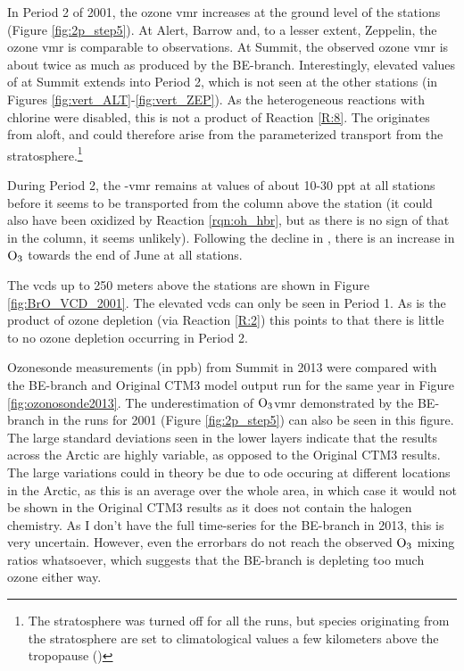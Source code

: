 \medskip

In Period 2 of 2001, the ozone \acrshort{vmr} increases at the ground level of the stations (Figure \ref{fig:2p_step5}). At Alert, Barrow and, to a lesser extent, Zeppelin, the ozone \acrshort{vmr} is comparable to observations. At Summit, the observed ozone \acrshort{vmr} is about twice as much as produced by the BE-branch. Interestingly, elevated values of  at Summit extends into Period 2, which is not seen at the other stations (in Figures \ref{fig:vert_ALT}-\ref{fig:vert_ZEP}). As the heterogeneous reactions with chlorine were disabled, this is not a product of Reaction \ref{R:8}. The  originates from aloft, and could therefore arise from the parameterized transport from the stratosphere.\footnote{The stratosphere was turned off for all the runs, but species originating from the stratosphere are set to climatological values a few kilometers above the tropopause (\cite{Sovde2012})} 

\medskip

During Period 2, the -\acrshort{vmr} remains at values of about 10-30 ppt at all stations before it seems to be transported from the column above the station (it could also have been oxidized by Reaction \ref{rqn:oh_hbr}, but as there is no sign of that in the  column, it seems unlikely). Following the decline in , there is an increase in $\mathrm{O_3}$ towards the end of June at all stations. 

\medskip

The  \acrshort{vcd}s up to 250 meters above the stations are shown in Figure \ref{fig:BrO_VCD_2001}. The elevated \acrshort{vcd}s can only be seen in Period 1. As  is the product of ozone depletion (via Reaction \ref{R:2}) this points to that there is little to no ozone depletion occurring in Period 2. 

\medskip

Ozonesonde measurements (in ppb) from Summit in 2013  were compared with the BE-branch and Original CTM3 model output run for the same year in Figure \ref{fig:ozonosonde2013}. The underestimation of $\mathrm{O_3}$\acrshort{vmr} demonstrated by the BE-branch in the runs for 2001 (Figure \ref{fig:2p_step5}) can also be seen in this figure. The large standard deviations seen in the lower layers indicate that the results across the Arctic are highly variable, as opposed to the Original CTM3 results. The large variations could in theory be due to \acrshort{ode} occuring at different locations in the Arctic, as this is an average over the whole area, in which case it would not be shown in the Original CTM3 results as it does not contain the halogen chemistry. As I don't have the full time-series for the BE-branch in 2013, this is very uncertain. However, even the errorbars do not reach the observed $\mathrm{O_3}$ mixing ratios whatsoever, which suggests that the BE-branch is depleting too much ozone either way.


